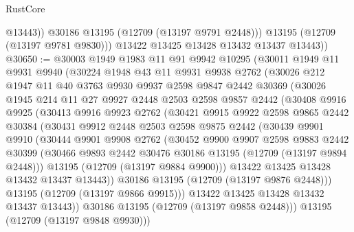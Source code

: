 \begin{lexlean}{RustCore}
\begin{coremodule}
                @13443))
            @30186
            @13195
            (@12709 (@13197 @9791 @2448)))
          @13195
          (@12709 (@13197 @9781 @9830)))
        @13422
        @13425
        @13428
        @13432
        @13437
        @13443))
@30650 := @30003
    @1949
    @1983
    @11
    @91
    @9942
    @10295
    (@30011
      @1949
      @11
      @9931
      @9940
      (@30224
        @1948
        @43
        @11
        @9931
        @9938
        @2762
        (@30026
          @212
          @1947
          @11
          @40
          @3763
          @9930
          @9937
          @2598
          @9847
          @2442
          @30369
          (@30026
            @1945
            @214
            @11
            @27
            @9927
            @2448
            @2503
            @2598
            @9857
            @2442
            (@30408
              @9916
              @9925
              (@30413
                @9916
                @9923
                @2762
                (@30421
                  @9915
                  @9922
                  @2598
                  @9865
                  @2442
                  @30384
                  (@30431
                    @9912
                    @2448
                    @2503
                    @2598
                    @9875
                    @2442
                    (@30439
                      @9901
                      @9910
                      (@30444
                        @9901
                        @9908
                        @2762
                        (@30452
                          @9900
                          @9907
                          @2598
                          @9883
                          @2442
                          @30399
                          (@30466 @9893 @2442 @30476 @30186 @13195 (@12709 (@13197 @9894 @2448)))
                          @13195
                          (@12709 (@13197 @9884 @9900)))
                        @13422
                        @13425
                        @13428
                        @13432
                        @13437
                        @13443))
                    @30186
                    @13195
                    (@12709 (@13197 @9876 @2448)))
                  @13195
                  (@12709 (@13197 @9866 @9915)))
                @13422
                @13425
                @13428
                @13432
                @13437
                @13443))
            @30186
            @13195
            (@12709 (@13197 @9858 @2448)))
          @13195
          (@12709 (@13197 @9848 @9930)))

\end{coremodule}
\end{lexlean}
